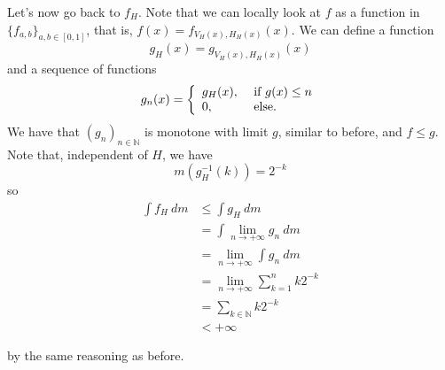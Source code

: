 \documentclass[a4paper,12pt,twoside,BCOR=10mm]{scrbook}
\theoremstyle{definition}
\theoremstyle{definition}
\theoremstyle{definition}
\begin{document}
Let's now go back to $f_H$.
Note that we can locally look at $f$ as a function in $\{f_{a, b}\}_{a, b \in [0, 1]}$, that is, $f(x) = f_{V_H(x), H_H(x)}(x)$.
We can define a function
\[
	g_H(x) = g_{V_H(x), H_H(x)}(x)
\]
and a sequence of functions
\[
	g_n(x) = \left \{
	\begin{array}{l l}
	g_H(x), & \text{ if } g(x) \leq n \\
	0, & \text{ else}.
	\end{array}
	\right .
\]
We have that $(g_n)_{n \in \mathbb{N}}$ is monotone with limit $g$, similar to before, and $f \leq g$.
Note that, independent of $H$, we have
\[
	m(g_H^{-1}(k)) = 2^{-k}
\]
so
\begin{align*}
\int f_H\ dm
&\leq \int g_H\ dm\\
&= \int \lim_{n \rightarrow +\infty} g_n\ dm\\
&= \lim_{n \rightarrow +\infty} \int g_n\ dm\\
&= \lim_{n \rightarrow +\infty} \sum_{k = 1}^n k2^{-k}\\
&= \sum_{k \in \mathbb{N}} k2^{-k}\\
&< +\infty
\end{align*}
\begin{center}
\end{center}
by the same reasoning as before.
\end{document}
